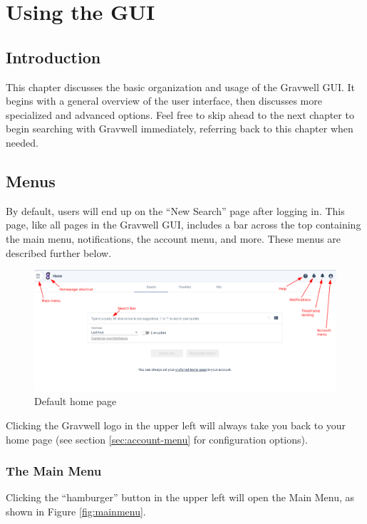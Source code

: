 \chapter{Using the GUI}

\section{Introduction}

This chapter discusses the basic organization and usage of the Gravwell GUI. It begins with a general overview of the user interface, then discusses more specialized and advanced options. Feel free to skip ahead to the next chapter to begin searching with Gravwell immediately, referring back to this chapter when needed.

\section{Menus}

By default, users will end up on the ``New Search'' page after logging in. This page, like all pages in the Gravwell GUI, includes a bar across the top containing the main menu, notifications, the account menu, and more. These menus are described further below.

\begin{figure}
	\includegraphics{images/homepage.png}
	\caption{Default home page}
	\label{fig:newsearch}
\end{figure}

Clicking the Gravwell logo in the upper left will always take you back to your home page (see section \ref{sec:account-menu} for configuration options).

\subsection{The Main Menu}

Clicking the ``hamburger'' button in the upper left will open the Main Menu, as shown in Figure \ref{fig:mainmenu}.

